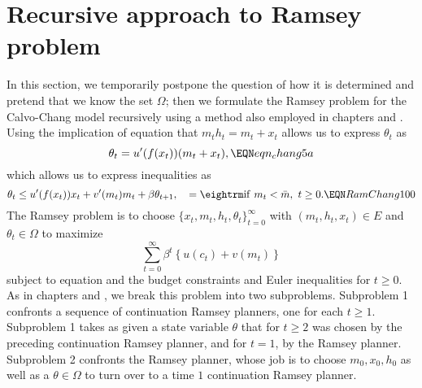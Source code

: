 \section{Recursive approach to Ramsey problem}\label{sec:Chang_Ramsey_mock0}%
In this section, we temporarily postpone the question of how it is determined and pretend that we know the set $\Omega$; then
we formulate the Ramsey problem for the Calvo-Chang model  recursively using a method also employed  in
chapters  and  .
Using the implication of equation  that $m_t h_t = m_t + x_t$ allows us to express $\theta_t$ as
$$ \theta_t = u'(f(x_t)) (m_t + x_t), \EQN eqn_chang5a $$
which %
allows us to  express inequalities  as %
$$ \theta_t \leq u'(f(x_t)) x_t + v'(m_t) m_t + \beta \theta_{t+1}, \quad = {\rm if} \ m_t < \bar m , \ t \geq 0 . \EQN RamChang100 $$
The Ramsey problem is to choose $\{x_t, m_t, h_t, \theta_t\}_{t=0}^\infty$ with $(m_t, h_t, x_t) \in E$ and $\theta_t \in \Omega$ to maximize
$$ \sum_{t=0}^\infty \beta^t \left\{ u(c_t) + v(m_t) \right\} $$
subject to  equation  and  %
the budget constraints   and  Euler   inequalities    for $t \geq 0$. As in chapters  and  , we break this problem  into two
subproblems.  Subproblem 1 confronts a sequence of continuation Ramsey planners, one for each $t \geq 1$.  Subproblem 1 takes as given a state
variable  $\theta$ that for $t \geq 2$ was chosen by the preceding continuation Ramsey planner, and for $t =1$, by the Ramsey planner.
Subproblem 2 confronts the Ramsey planner, whose job is to choose $m_0, x_0, h_0$ as well as  a $\theta \in \Omega$ to turn over to a time $1$ continuation Ramsey planner.


